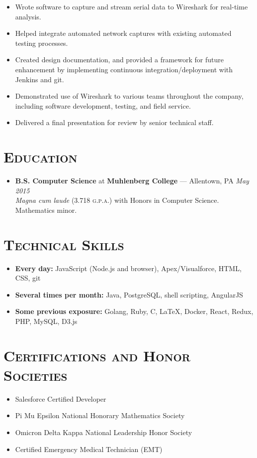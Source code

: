 \documentclass[11pt]{article}
\begin{document}
\begin{itemize}
\begin{itemize}
      \item Wrote software to capture and stream serial data to Wireshark for real-time analysis.
      \item Helped integrate automated network captures with existing automated testing processes.
      \item Created design documentation, and provided a framework for future enhancement by implementing continuous integration/deployment with Jenkins and git.
      \item Demonstrated use of Wireshark to various teams throughout the company, including software development, testing, and field service.
      \item Delivered a final presentation for review by senior technical staff.
    \end{itemize}
\end{itemize}



\section*{\textsc{Education}}
\begin{itemize}
  \item \textbf{B.S. Computer Science} at \textbf{Muhlenberg College} --- Allentown, PA \hfill {\em May 2015} \\
    {\em Magna cum laude} (3.718 \textsc{g.p.a.}) with Honors in Computer Science. Mathematics minor.
\end{itemize}



\section*{\textsc{Technical Skills}}
\begin{itemize}
  \item \textbf{Every day:} JavaScript (Node.js and browser), Apex/Visualforce, HTML, CSS, git
  \item \textbf{Several times per month:} Java, PostgreSQL, shell scripting, AngularJS
  \item \textbf{Some previous exposure:} Golang, Ruby, C, LaTeX, Docker, React, Redux, PHP, MySQL, D3.js
\end{itemize}



\section*{\textsc{Certifications and Honor Societies}}
\begin{itemize}
  \item Salesforce Certified Developer
  \item Pi Mu Epsilon National Honorary Mathematics Society
  \item Omicron Delta Kappa National Leadership Honor Society
  \item Certified Emergency Medical Technician (EMT)
\end{itemize}
\end{document}
